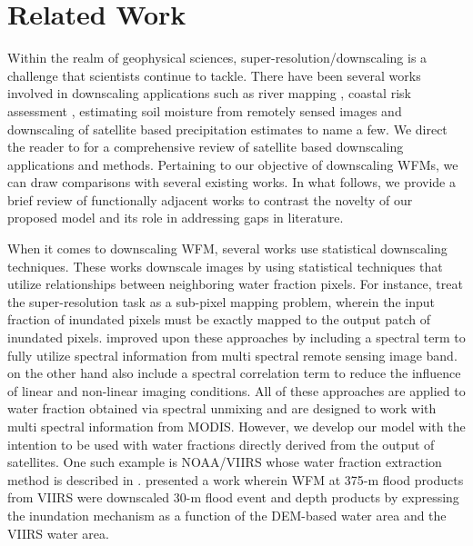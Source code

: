\section{Related Work}
\label{sec:RelatedWork}

Within the realm of geophysical sciences, super-resolution/downscaling is a challenge that scientists continue to tackle. There have been several works involved in downscaling applications such as river mapping \cite{Yin2022}, coastal risk assessment \cite{Rucker2021}, estimating soil moisture from remotely sensed images \cite{Peng2017SoilMoisture} and downscaling of satellite based precipitation estimates \cite{Medrano2023PrecipitationDownscaling} to name a few. We direct the reader to \cite{Karwowska2022SuperResolutionSurvey} for a comprehensive review of satellite based downscaling applications and methods. Pertaining to our objective of downscaling \acp{WFM}, we can draw comparisons with several existing works. 
In what follows, we provide a brief review of functionally adjacent works to contrast the novelty of our proposed model and its role in addressing gaps in literature. 

When it comes to downscaling \ac{WFM}, several works use statistical downscaling techniques. These works downscale images by using statistical techniques that utilize relationships between neighboring water fraction pixels. For instance, \cite{Li2015SRFIM} treat the super-resolution task as a sub-pixel mapping problem, wherein the input fraction of inundated pixels must be exactly mapped to the output patch of inundated pixels. 
\cite{Wang2019} improved upon these approaches by including a spectral term to fully utilize spectral information from multi spectral remote sensing image band. \cite{Wang2021} on the other hand also include a spectral correlation term to reduce the influence of linear and non-linear imaging conditions. All of these approaches are applied to water fraction obtained via spectral unmixing \cite{wang2013SpectralUnmixing} and are designed to work with multi spectral information from MODIS. However, we develop our model with the intention to be used with water fractions directly derived from the output of satellites. One such example is NOAA/VIIRS whose water fraction extraction method is described in \cite{Li2013VIIRSWFM}. \cite{Li2022VIIRSDownscaling} presented a work wherein \ac{WFM} at 375-m flood products from VIIRS were downscaled 30-m flood event and depth products by expressing the inundation mechanism as a function of the \ac{DEM}-based water area and the VIIRS water area.

